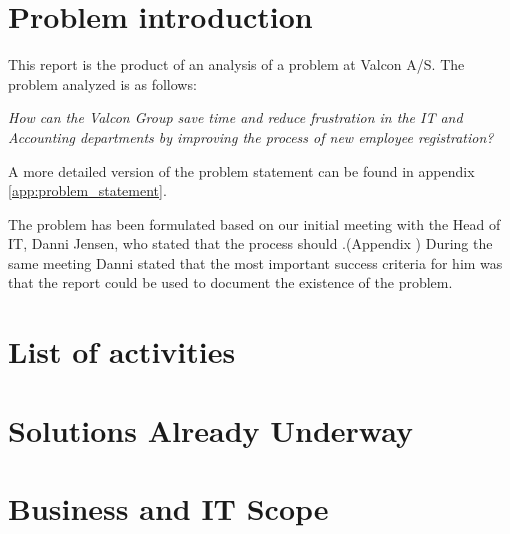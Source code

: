 \section{Problem introduction}
This report is the product of an analysis of a problem at Valcon A/S.
The problem analyzed is as follows:

\emph{How can the Valcon Group save time and reduce frustration in the IT and Accounting departments by improving the process of new employee registration?}

A more detailed version of the problem statement can be found in appendix \ref{app:problem_statement}.

The problem has been formulated based on our initial meeting with the Head of IT, Danni Jensen, who stated that the process should .(Appendix )  
During the same meeting Danni stated that the most important success criteria for him was that the report could be used to document the existence of the problem.

\section{List of activities}


\section{Solutions Already Underway}


\section{Business and IT Scope}

